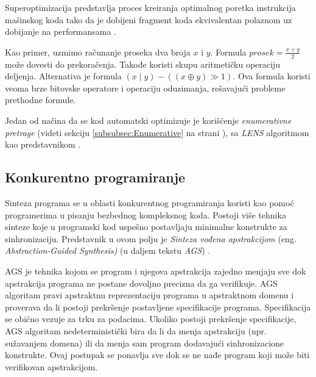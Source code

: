 Superoptimizacija predstavlja proces kreiranja optimalnog poretka instrukcija mašinskog koda tako da je dobijeni fragment koda ekvivalentan polaznom uz dobijanje na performansama \cite{Superoptimizer}.

Kao primer, uzmimo računanje proseka dva broja $x$ i $y$. Formula $\mathit{prosek}=\frac{x+y}{2}$ može dovesti do prekoračenja. Takođe koristi skupu aritmetičku operaciju deljenja. Alternativa je formula $(x \mid y)-((x \oplus y) \gg 1)$. Ova formula koristi veoma brze bitovske operatore i operaciju oduzimanja, rešavajući probleme prethodne formule.

Jedan od načina da se kod automatski optimizuje je korišćenje  \emph{enumerativne pretrage} (videti sekciju \ref{subsubsec:Enumerative} na strani \pageref{subsubsec:Enumerative}), sa \emph{LENS} algoritmom kao predstavnikom \cite{ScalingUpSuperoptimization}.


\subsection{Konkurentno programiranje}
\label{subsec:KonkurentnoProgramiranje}

Sinteza programa se u oblasti konkurentnog programiranja koristi kao pomoć programerima u pisanju bezbednog kompleksnog koda. Postoji više tehnika sinteze koje u programski kod uspešno postavljaju minimalne konstrukte za sinhronizaciju. Predstavnik u ovom polju je \emph{Sinteza vođena apstrakcijom} (eng. \emph{Abstraction-Guided Synthesis)} (u daljem tekstu \emph{AGS})  \cite{AGS}.

AGS je tehnika kojom se program i njegova apstrakcija zajedno menjaju sve dok apstrakcija programa ne postane dovoljno precizna da ga verifikuje. AGS algoritam pravi apstraktnu reprezentaciju programa u apstraktnom domenu i proverava da li postoji prekršenje postavljene specifikacije programa. Specifikacija se obično vezuje za trku za podacima. Ukoliko postoji prekršenje specifikacije, AGS algoritam nedeterministički bira da li da menja apstrakciju (npr. sužavanjem domena) ili da menja sam program dodavajući sinhronizacione konstrukte. Ovaj postupak se ponavlja sve dok se ne nađe program koji može biti verifikovan apstrakcijom.

